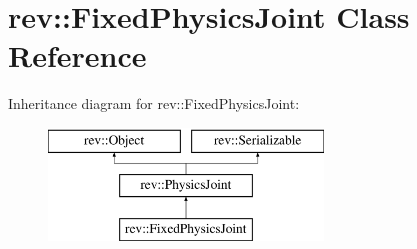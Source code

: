 \hypertarget{classrev_1_1_fixed_physics_joint}{}\section{rev\+::Fixed\+Physics\+Joint Class Reference}
\label{classrev_1_1_fixed_physics_joint}
Inheritance diagram for rev\+::Fixed\+Physics\+Joint\+:\begin{figure}[H]
\begin{center}
\leavevmode
\includegraphics[height=3.000000cm]{classrev_1_1_fixed_physics_joint}
\end{center}
\end{figure}
